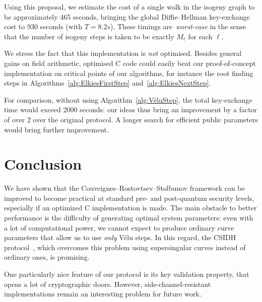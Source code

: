 \documentclass{llncs}
\begin{document}
Using this proposal, we estimate the cost of a single walk in the
isogeny graph to be approximately 465 seconds, bringing the global
Diffie--Hellman key-exchange cost to 930 seconds (with $T = 8.2s$).
These timings are~\emph{worst-case}
in the sense that the number of isogeny steps is taken
to be exactly $M_\ell$ for each $\ell$.

We stress the fact that this implementation
is \emph{not} optimised. Besides general gains on field arithmetic,
optimised C code could easily beat our proof-of-concept implementation
on critical points of our algorithms, for instance the root finding steps 
in Algorithms~\ref{alg:ElkiesFirstStep}
and~\ref{alg:ElkiesNextStep}.

For comparison, without using Algorithm~\ref{alg:VéluStep}, the
total key-exchange time would exceed 2000 seconds:
our ideas thus bring an improvement by a factor of over 2 over the
original protocol. A longer search for efficient public
parameters would bring further improvement.

\section{Conclusion}

We have shown that the Couveignes--Rostovtsev--Stolbunov
framework can be improved to become practical at standard pre- and
post-quantum security levels, especially if an optimized C implementation
is made. 
The main obstacle to better performance 
is the difficulty of generating optimal system parameters:
even with a lot of computational power,
we cannot expect to produce ordinary curve parameters
that allow us to use \emph{only} Vélu steps. 
In this regard, the CSIDH protocol~\cite{csidh}, 
which overcomes this problem using
supersingular curves instead of ordinary ones, is promising.

One particularly nice feature of our protocol is its key validation property,
that opens a lot of cryptographic doors. However, side-channel-resistant
implementations remain an interesting problem for future work.




\end{document}
